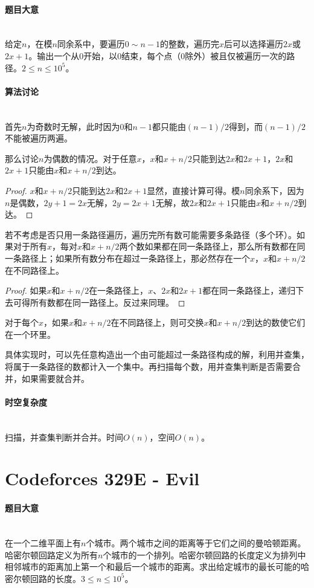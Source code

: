 \documentclass[UTF8]{ctexart}
\newcommand{\myparagraph}[1]{\paragraph{#1}\mbox{}\\}
\theoremstyle{nonumberplain}
\newtheorem{proof}{\hspace{1em}证明：}
\begin{document}
		\myparagraph{题目大意}
		
			给定$n$，在模$n$同余系中，要遍历$0 \sim n-1$的整数，遍历完$x$后可以选择遍历$2x$或$2x+1$。输出一个从0开始，以0结束，每个点（0除外）被且仅被遍历一次的路径。$2 \leq n \leq 10^5$。
		
		\myparagraph{算法讨论}
		
			首先$n$为奇数时无解，此时因为0和$n-1$都只能由$(n-1)/2$得到，而$(n-1)/2$不能被遍历两遍。
			
			那么讨论$n$为偶数的情况。对于任意$x$，$x$和$x+n/2$只能到达$2x$和$2x+1$，$2x$和$2x+1$只能由$x$和$x+n/2$到达。
			
			\begin{proof} $x$和$x+n/2$只能到达$2x$和$2x+1$显然，直接计算可得。模$n$同余系下，因为$n$是偶数，$2y+1=2x$无解，$2y=2x+1$无解，故$2x$和$2x+1$只能由$x$和$x+n/2$到达。 \end{proof}
			
			若不考虑是否只用一条路径遍历，遍历完所有数可能需要多条路径（多个环）。如果对于所有$x$，每对$x$和$x+n/2$两个数如果都在同一条路径上，那么所有数都在同一条路径上；如果所有数分布在超过一条路径上，那必然存在一个$x$，$x$和$x+n/2$在不同路径上。
			
			\begin{proof} 如果$x$和$x+n/2$在一条路径上，$x$、$2x$和$2x+1$都在同一条路径上，递归下去可得所有数都在同一路径上。反过来同理。 \end{proof}
			
			对于每个$x$，如果$x$和$x+n/2$在不同路径上，则可交换$x$和$x+n/2$到达的数使它们在一个环里。
			
			具体实现时，可以先任意构造出一个由可能超过一条路径构成的解，利用并查集，将属于一条路径的数都计入一个集中。再扫描每个数，用并查集判断是否需要合并，如果需要就合并。
		
		\myparagraph{时空复杂度}
		
			扫描，并查集判断并合并。时间$O(n)$，空间$O(n)$。
	
	\section{Codeforces 329E - Evil}
	
		\myparagraph{题目大意}
		
			在一个二维平面上有$n$个城市。两个城市之间的距离等于它们之间的曼哈顿距离。哈密尔顿回路定义为所有$n$个城市的一个排列。哈密尔顿回路的长度定义为排列中相邻城市的距离加上第一个和最后一个城市的距离。求出给定城市的最长可能的哈密尔顿回路的长度。$3 \leq n \leq 10^5$。
			
\end{document}
